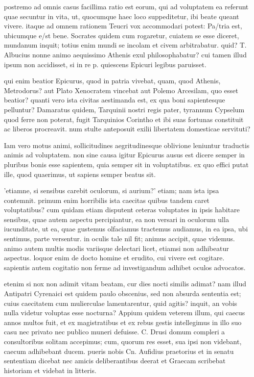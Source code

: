 postremo ad omnis casus facillima ratio est eorum, qui ad voluptatem ea referunt quae secuntur in vita, ut, quocumque haec loco suppeditetur, ibi beate queant vivere. itaque ad omnem rationem Teucri vox accommodari potest: Pa/tria est, ubicumque e/st bene. Socrates quidem cum rogaretur, cuiatem se esse diceret, mundanum inquit; totius enim mundi se incolam et civem arbitrabatur. quid? T. Albucius nonne animo aequissimo Athenis exul philosophabatur? cui tamen illud ipsum non accidisset, si in re p. quiescens Epicuri legibus paruisset.

 qui enim beatior Epicurus, quod in patria vivebat, quam, quod Athenis, Metrodorus? aut Plato Xenocratem vincebat aut Polemo Arcesilam, quo esset beatior? quanti vero ista civitas aestimanda est, ex qua boni sapientesque pelluntur? Damaratus quidem, Tarquinii nostri regis pater, tyrannum Cypselum quod ferre non poterat, fugit Tarquinios Corintho et ibi suas fortunas constituit ac liberos procreavit. num stulte anteposuit exilii libertatem domesticae servituti?

 Iam vero motus animi, sollicitudines aegritudinesque oblivione leniuntur traductis animis ad voluptatem. non sine causa igitur Epicurus ausus est dicere semper in pluribus bonis esse sapientem, quia semper sit in voluptatibus. ex quo effici putat ille, quod quaerimus, ut sapiens semper beatus sit.

 'etiamne, si sensibus carebit oculorum, si aurium?' etiam; nam ista ipsa contemnit. primum enim horribilis ista caecitas quibus tandem caret voluptatibus? cum quidam etiam disputent ceteras voluptates in ipsis habitare sensibus, quae autem aspectu percipiantur, ea non versari in oculorum ulla iucunditate, ut ea, quae gustemus olfaciamus tractemus audiamus, in ea ipsa, ubi sentimus, parte versentur. in oculis tale nil fit; animus accipit, quae videmus. animo autem multis modis variisque delectari licet, etiamsi non adhibeatur aspectus. loquor enim de docto homine et erudito, cui vivere est cogitare. sapientis autem cogitatio non ferme ad investigandum adhibet oculos advocatos.

 etenim si nox non adimit vitam beatam, cur dies nocti similis adimat? nam illud Antipatri Cyrenaici est quidem paulo obscenius, sed non absurda sententia est; cuius caecitatem cum mulierculae lamentarentur, quid agitis? inquit, an vobis nulla videtur voluptas esse nocturna? Appium quidem veterem illum, qui caecus annos multos fuit, et ex magistratibus et ex rebus gestis intellegimus in illo suo casu nec privato nec publico muneri defuisse. C. Drusi domum compleri a consultoribus solitam accepimus; cum, quorum res esset, sua ipsi non videbant, caecum adhibebant ducem. pueris nobis Cn. Aufidius praetorius et in senatu sententiam dicebat nec amicis deliberantibus deerat et Graecam scribebat historiam et videbat in litteris.

